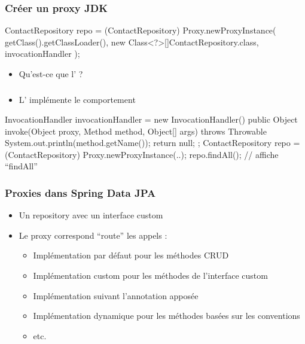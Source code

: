 \begin{frame}[fragile]
 \frametitle{Créer un proxy JDK}

\begin{javacode}
ContactRepository repo = (ContactRepository) Proxy.newProxyInstance(
  getClass().getClassLoader(),
  new Class<?>[]{ContactRepository.class},
  invocationHandler
);
\end{javacode}

 \begin{itemize}
  \item Qu'est-ce que l' ?
 \end{itemize}

\end{frame}

\begin{frame}[fragile]
 \frametitle{}
 \begin{itemize}
  \item L' implémente le comportement
 \end{itemize}

\begin{javacode}
InvocationHandler invocationHandler = new InvocationHandler() {      
  public Object invoke(Object proxy, Method method, Object[] args)
                                throws Throwable {
    System.out.println(method.getName());
    return null;
  }
};
ContactRepository repo = (ContactRepository) Proxy.newProxyInstance(..);
repo.findAll(); // affiche ``findAll''
\end{javacode}

\end{frame}

\begin{frame}[fragile]
 \frametitle{Proxies dans Spring Data JPA}
 \begin{itemize}
  \item Un repository avec un interface custom
  \item Le proxy correspond ``route'' les appels :
  \begin{itemize}
   \item Implémentation par défaut pour les méthodes CRUD
   \item Implémentation custom pour les méthodes de l'interface custom
   \item Implémentation suivant l'annotation apposée
   \item Implémentation dynamique pour les méthodes basées sur les conventions
   \item etc.
  \end{itemize}
 \end{itemize}

\end{frame}